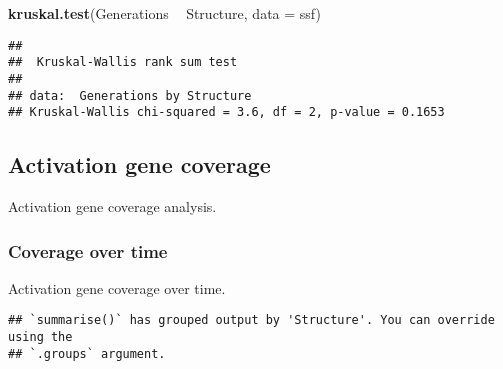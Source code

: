 \documentclass[]{book}
\newenvironment{Shaded}{\begin{snugshade}}{\end{snugshade}}
\newcommand{\CharTok}[1]{\textcolor[rgb]{0.31,0.60,0.02}{#1}}
\newcommand{\CommentTok}[1]{\textcolor[rgb]{0.56,0.35,0.01}{\textit{#1}}}
\newcommand{\DataTypeTok}[1]{\textcolor[rgb]{0.13,0.29,0.53}{#1}}
\newcommand{\KeywordTok}[1]{\textcolor[rgb]{0.13,0.29,0.53}{\textbf{#1}}}
\newcommand{\NormalTok}[1]{#1}
\newcommand{\OperatorTok}[1]{\textcolor[rgb]{0.81,0.36,0.00}{\textbf{#1}}}
\newcommand{\StringTok}[1]{\textcolor[rgb]{0.31,0.60,0.02}{#1}}
\begin{document}
\begin{Shaded}
\begin{Highlighting}[]
\KeywordTok{kruskal.test}\NormalTok{(Generations }\OperatorTok{~}\StringTok{ }\NormalTok{Structure, }\DataTypeTok{data =}\NormalTok{ ssf)}
\end{Highlighting}
\end{Shaded}

\begin{verbatim}
## 
##  Kruskal-Wallis rank sum test
## 
## data:  Generations by Structure
## Kruskal-Wallis chi-squared = 3.6, df = 2, p-value = 0.1653
\end{verbatim}

\hypertarget{activation-gene-coverage-15}{%
\subsection{Activation gene coverage}\label{activation-gene-coverage-15}}

Activation gene coverage analysis.

\hypertarget{coverage-over-time-24}{%
\subsubsection{Coverage over time}\label{coverage-over-time-24}}

Activation gene coverage over time.

\begin{Shaded}
\end{Shaded}

\begin{verbatim}
## `summarise()` has grouped output by 'Structure'. You can override using the
## `.groups` argument.
\end{verbatim}
\end{document}
